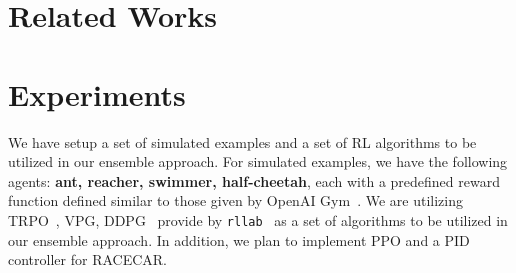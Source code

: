 \documentclass{article}
\begin{document}
%

\section{Related Works}

\newpage


\section{Experiments}

We have setup a set of simulated examples and a set of RL algorithms to be utilized in our ensemble approach. For simulated examples, we have the following agents: \textbf{ant, reacher, swimmer, half-cheetah}, each with a predefined reward function defined similar to those given by OpenAI Gym~\cite{openai}. We are utilizing TRPO~\cite{trpo}, VPG, DDPG~\cite{ddpg} provide by \texttt{rllab}~\cite{duan2016benchmarking} as a set of algorithms to be utilized in our ensemble approach. In addition, we plan to implement PPO and a PID controller for RACECAR.
\end{document}
